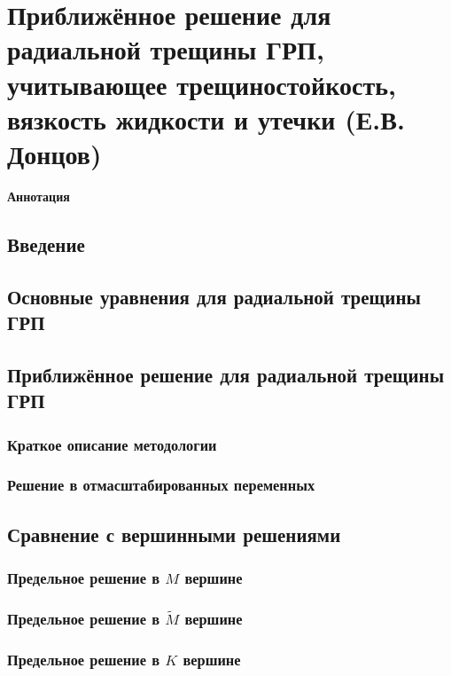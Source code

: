 \documentclass[main.tex]{subfiles}
\begin{document}
\section*{Приближённое решение для радиальной трещины ГРП, учитывающее трещиностойкость, вязкость жидкости и утечки (Е.В. Донцов)}

\textbf{Аннотация}


\subsection{Введение}

\subsection{Основные уравнения для радиальной трещины ГРП}

\subsection{Приближённое решение для радиальной трещины ГРП}

\subsubsection{Краткое описание методологии}

\subsubsection{Решение в отмасштабированных переменных}

\subsection{Сравнение с вершинными решениями}

\subsubsection{Предельное решение в $M$ вершине}

\subsubsection{Предельное решение в $\tilde{M}$ вершине}

\subsubsection{Предельное решение в $K$ вершине}
\end{document}
